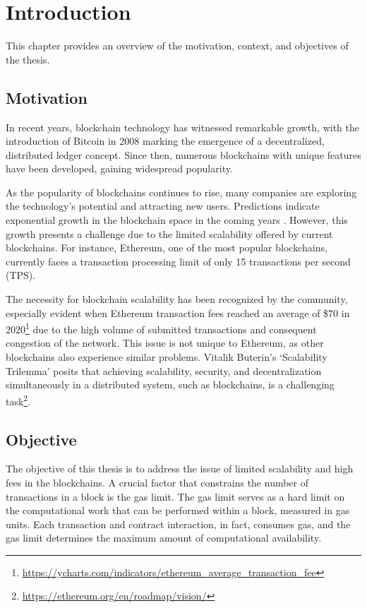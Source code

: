\chapter{Introduction}\label{cha:chapter1}

This chapter provides an overview of the motivation, context, and objectives of the thesis.

\section{Motivation}\label{sec:moti}

In recent years, blockchain technology has witnessed remarkable growth, with the introduction of Bitcoin in 2008 \cite{nakamoto_bitcoin_2008} marking the emergence of a decentralized, distributed ledger concept. Since then, numerous blockchains with unique features have been developed, gaining widespread popularity.

As the popularity of blockchains continues to rise, many companies are exploring the technology's potential and attracting new users. Predictions indicate exponential growth in the blockchain space in the coming years \cite{noauthor_global_nodate}. However, this growth presents a challenge due to the limited scalability offered by current blockchains. For instance, Ethereum, one of the most popular blockchains, currently faces a transaction processing limit of only 15 transactions per second (TPS).

The necessity for blockchain scalability has been recognized by the community, especially evident when Ethereum transaction fees reached an average of \$70 in 2020\footnote{\url{https://ycharts.com/indicators/ethereum_average_transaction_fee}} due to the high volume of submitted transactions and consequent congestion of the network. This issue is not unique to Ethereum, as other blockchains also experience similar problems. Vitalik Buterin's `Scalability Trilemma' posits that achieving scalability, security, and decentralization simultaneously in a distributed system, such as blockchains, is a challenging task\footnote{\url{https://ethereum.org/en/roadmap/vision/}}.

\section{Objective}\label{sec:objective}

The objective of this thesis is to address the issue of limited scalability and high fees in the blockchains. A crucial factor that constrains the number of transactions in a block is the gas limit. The gas limit serves as a hard limit on the computational work that can be performed within a block, measured in gas units. Each transaction and contract interaction, in fact, consumes gas, and the gas limit determines the maximum amount of computational availability.

